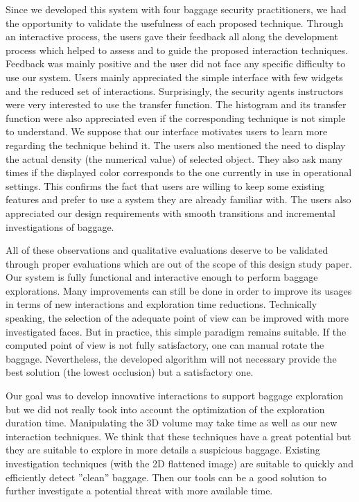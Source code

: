 Since we developed this system with four baggage security practitioners, we had the opportunity to validate the usefulness of each proposed technique. Through an interactive process, the users gave their feedback all along the development process which helped to assess and to guide the proposed interaction techniques. Feedback was mainly positive and the user did not face any specific difficulty to use our system. Users mainly appreciated the simple interface with few widgets and the reduced set of interactions. Surprisingly, the security agents instructors were very interested to use the transfer function. The histogram and its transfer function were also appreciated even if the corresponding technique is not simple to understand. We suppose that our interface motivates users to learn more regarding the technique behind it. The users also mentioned the need to display the actual density (the numerical value) of selected object. They also ask many times if the displayed color corresponds to the one currently in use in operational settings. This confirms the fact that users are willing to keep some existing features and prefer to use a system they are already familiar with.
The users also appreciated our design requirements with smooth transitions and incremental investigations of baggage.
\par All of these observations and qualitative evaluations deserve to be validated through proper evaluations which are out of the scope of this design study paper.
Our system is fully functional and interactive enough to perform baggage explorations. Many improvements can still be done in order to improve its usages in terms of new interactions and exploration time reductions.
Technically speaking, the selection of the adequate point of view can be improved with more  investigated faces. But in practice, this simple paradigm remains suitable. If the computed point of view is not fully satisfactory, one can manual rotate the baggage. Nevertheless, the developed algorithm will not necessary provide the best solution (the lowest occlusion) but a satisfactory one.
\par Our goal was to develop innovative interactions to support baggage exploration but we did not really took into account the optimization of the exploration duration time. Manipulating the 3D volume may take time as well as our new interaction techniques. We think that these techniques have a great potential but they are suitable to explore in more details a suspicious baggage. Existing investigation techniques (with the 2D flattened image) are suitable to quickly and efficiently detect ''clean'' baggage. Then our tools can be a good solution to further investigate a potential threat with more available time.



